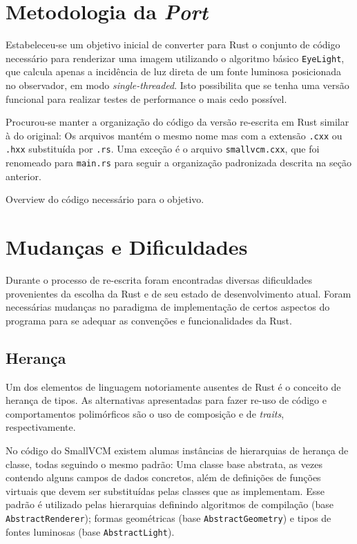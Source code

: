 \documentclass[tg]{mdtufsm}
\newcommand{\todo}[1]{\textsf{\color{red}#1}}
\begin{document}
\section{Metodologia da \emph{Port}}

Estabeleceu-se um objetivo inicial de converter para Rust o conjunto de código necessário para renderizar uma imagem utilizando o algoritmo básico \texttt{EyeLight}, que calcula apenas a incidência de luz direta de um fonte luminosa posicionada no observador, em modo \emph{single-threaded}. Isto possibilita que se tenha uma versão funcional para realizar testes de performance o mais cedo possível.

Procurou-se manter a organização do código da versão re-escrita em Rust similar à do original: Os arquivos mantém o mesmo nome mas com a extensão \texttt{.cxx} ou \texttt{.hxx} substituída por \texttt{.rs}. Uma exceção é o arquivo \texttt{smallvcm.cxx}, que foi renomeado para \texttt{main.rs} para seguir a organização padronizada descrita na seção anterior.

\todo{Overview do código necessário para o objetivo.}

\section{Mudanças e Dificuldades}

Durante o processo de re-escrita foram encontradas diversas dificuldades provenientes da escolha da Rust e de seu estado de desenvolvimento atual. Foram necessárias mudanças no paradigma de implementação de certos aspectos do programa para se adequar as convenções e funcionalidades da Rust.

\subsection{Herança}

Um dos elementos de linguagem notoriamente ausentes de Rust é o conceito de herança de tipos. As alternativas apresentadas para fazer re-uso de código e comportamentos polimórficos são o uso de composição e de \emph{traits}, respectivamente.

No código do SmallVCM existem alumas instâncias de hierarquias de herança de classe, todas seguindo o mesmo padrão: Uma classe base abstrata, as vezes contendo alguns campos de dados concretos, além de definições de funções virtuais que devem ser substituídas pelas classes que as implementam. Esse padrão é utilizado pelas hierarquias definindo algoritmos de compilação (base \texttt{AbstractRenderer}); formas geométricas (base \texttt{AbstractGeometry}) e tipos de fontes luminosas (base \texttt{AbstractLight}).
\end{document}
